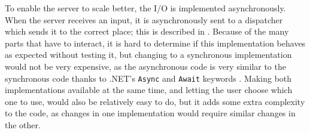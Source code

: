 To enable the server to scale better, the I/O is implemented asynchronously. When the server receives an input, it is asynchronously sent to a dispatcher which sends it to the correct place; this is described in . Because of the many parts that have to interact, it is hard to determine if this implementation behaves as expected without testing it, but changing to a synchronous implementation would not be very expensive, as the asynchronous code is very similar to the synchronous code thanks to .NET's \texttt{Async} and \texttt{Await} keywords \cite{ms-asyn}. Making both implementations available at the same time, and letting the user choose which one to use, would also be relatively easy to do, but it adds some extra complexity to the code, as changes in one implementation would require similar changes in the other.



%
%

